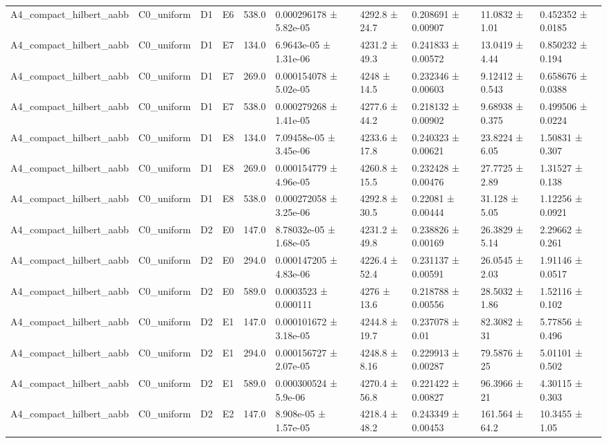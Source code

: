 \begin{table}
\begin{tabular}{llllllllll}
A4\_compact\_hilbert\_aabb & C0\_uniform & D1 & E6 & 538.0 & 0.000296178 ± 5.82e-05 & 4292.8 ± 24.7 & 0.208691 ± 0.00907 & 11.0832 ± 1.01 & 0.452352 ± 0.0185 \\
A4\_compact\_hilbert\_aabb & C0\_uniform & D1 & E7 & 134.0 & 6.9643e-05 ± 1.31e-06 & 4231.2 ± 49.3 & 0.241833 ± 0.00572 & 13.0419 ± 4.44 & 0.850232 ± 0.194 \\
A4\_compact\_hilbert\_aabb & C0\_uniform & D1 & E7 & 269.0 & 0.000154078 ± 5.02e-05 & 4248 ± 14.5 & 0.232346 ± 0.00603 & 9.12412 ± 0.543 & 0.658676 ± 0.0388 \\
A4\_compact\_hilbert\_aabb & C0\_uniform & D1 & E7 & 538.0 & 0.000279268 ± 1.41e-05 & 4277.6 ± 44.2 & 0.218132 ± 0.00902 & 9.68938 ± 0.375 & 0.499506 ± 0.0224 \\
A4\_compact\_hilbert\_aabb & C0\_uniform & D1 & E8 & 134.0 & 7.09458e-05 ± 3.45e-06 & 4233.6 ± 17.8 & 0.240323 ± 0.00621 & 23.8224 ± 6.05 & 1.50831 ± 0.307 \\
A4\_compact\_hilbert\_aabb & C0\_uniform & D1 & E8 & 269.0 & 0.000154779 ± 4.96e-05 & 4260.8 ± 15.5 & 0.232428 ± 0.00476 & 27.7725 ± 2.89 & 1.31527 ± 0.138 \\
A4\_compact\_hilbert\_aabb & C0\_uniform & D1 & E8 & 538.0 & 0.000272058 ± 3.25e-06 & 4292.8 ± 30.5 & 0.22081 ± 0.00444 & 31.128 ± 5.05 & 1.12256 ± 0.0921 \\
A4\_compact\_hilbert\_aabb & C0\_uniform & D2 & E0 & 147.0 & 8.78032e-05 ± 1.68e-05 & 4231.2 ± 49.8 & 0.238826 ± 0.00169 & 26.3829 ± 5.14 & 2.29662 ± 0.261 \\
A4\_compact\_hilbert\_aabb & C0\_uniform & D2 & E0 & 294.0 & 0.000147205 ± 4.83e-06 & 4226.4 ± 52.4 & 0.231137 ± 0.00591 & 26.0545 ± 2.03 & 1.91146 ± 0.0517 \\
A4\_compact\_hilbert\_aabb & C0\_uniform & D2 & E0 & 589.0 & 0.0003523 ± 0.000111 & 4276 ± 13.6 & 0.218788 ± 0.00556 & 28.5032 ± 1.86 & 1.52116 ± 0.102 \\
A4\_compact\_hilbert\_aabb & C0\_uniform & D2 & E1 & 147.0 & 0.000101672 ± 3.18e-05 & 4244.8 ± 19.7 & 0.237078 ± 0.01 & 82.3082 ± 31 & 5.77856 ± 0.496 \\
A4\_compact\_hilbert\_aabb & C0\_uniform & D2 & E1 & 294.0 & 0.000156727 ± 2.07e-05 & 4248.8 ± 8.16 & 0.229913 ± 0.00287 & 79.5876 ± 25 & 5.01101 ± 0.502 \\
A4\_compact\_hilbert\_aabb & C0\_uniform & D2 & E1 & 589.0 & 0.000300524 ± 5.9e-06 & 4270.4 ± 56.8 & 0.221422 ± 0.00827 & 96.3966 ± 21 & 4.30115 ± 0.303 \\
A4\_compact\_hilbert\_aabb & C0\_uniform & D2 & E2 & 147.0 & 8.908e-05 ± 1.57e-05 & 4218.4 ± 48.2 & 0.243349 ± 0.00453 & 161.564 ± 64.2 & 10.3455 ± 1.05 \\

\end{tabular}
\end{table}
